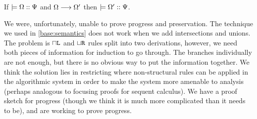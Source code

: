 \begin{conjecture}[Preservation]
If $\models {\Omega} :: {\Psi}$ and $\Omega \longrightarrow \Omega'$ then $\models {\Omega'} :: {\Psi}$.
\end{conjecture}


We were, unfortunately, unable to prove progress and preservation. The technique we used in \cref{base:semantics} does not work when we add intersections and unions. The problem is $\mathbin{\sqcap}\texttt{L}$ and $\mathbin{\sqcup}\texttt{R}$ rules split into two derivations, however, we need both pieces of information for induction to go through. The branches individually are not enough, but there is no obvious way to put the information together. We think the solution lies in restricting where non-structural rules can be applied in the algorithmic system in order to make the system more amenable to analysis (perhaps analogous to focusing proofs for sequent calculus). We have a proof sketch for progress (though we think it is much more complicated than it needs to be), and are working to prove progress.

